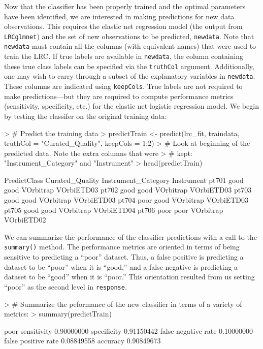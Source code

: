 \documentclass{article}
\begin{document}
Now that the classifier has been properly trained and the optimal parameters have been identified, we are 
interested in making predictions for new data observations. This requires the elastic net regression model 
(the output from {\tt LRCglmnet}) and the set of new observations to be predicted, {\tt newdata}.  
Note that {\tt newdata} must contain all the columns (with equivalent names) that were used to train the LRC.
If true labels are available in {\tt newdata}, the column containing 
these true class labels can be specified via the 
{\tt truthCol} argument. Additionally, one may wish to carry through a subset of the explanatory variables in 
{\tt newdata}.  These columns are indicated using {\tt keepCols}.   True labels are not required to make 
predictions---but they are required to compute performance metrics (sensitivity, specificity, etc.) for the 
elastic net logistic regression model. We begin by testing the classifer on the original training data:
\begin{Schunk}
\begin{Sinput}
> # Predict the training data
> predictTrain <- predict(lrc_fit, traindata, truthCol = "Curated_Quality", keepCols = 1:2)
> # Look at beginning of the predicted data.  Note the extra columns that were 
> # kept:  "Instrument_Category" and "Instrument"
> head(predictTrain)
\end{Sinput}
\begin{Soutput}
      PredictClass Curated_Quality Instrument_Category Instrument
pt701         good            good           VOrbitrap VOrbiETD03
pt702         good            good           VOrbitrap VOrbiETD03
pt703         good            good           VOrbitrap VOrbiETD03
pt704         poor            good           VOrbitrap VOrbiETD03
pt705         good            good           VOrbitrap VOrbiETD04
pt706         poor            poor           VOrbitrap VOrbiETD02
\end{Soutput}
\end{Schunk}
\noindent We can summarize the performance of the classifier predictions with a call to the {\tt summary()} method.
The performance metrics are oriented in terms of being sensitive to predicting a ``poor'' dataset.  Thus, a 
false positive is predicting a dataset to be ``poor'' when it is ``good,'' and a false negative is predicting a 
dataset to be ``good'' when it is ``poor.''  This orientation resulted from us setting ``poor'' as the second
level in {\tt response}.
\begin{Schunk}
\begin{Sinput}
> # Summarize the peformance of the new classifier in terms of a variety of metrics:
> summary(predictTrain)
\end{Sinput}
\begin{Soutput}
                          poor
sensitivity         0.90000000
specificity         0.91150442
false negative rate 0.10000000
false positive rate 0.08849558
accuracy            0.90849673
\end{Soutput}
\end{Schunk}
\end{document}
